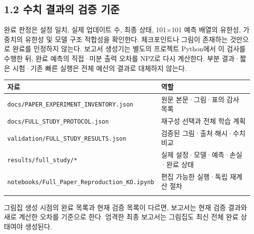\documentclass[10pt,a4paper]{article}
\begin{document}
\subsection{1.2 수치 결과의 검증 기준}

완료 판정은 설정 일치, 실제 업데이트 수, 최종 상태, 101$\times$101 예측 배열의 유한성, 가중치의 유한성 및 모델 구조 적합성을 확인한다. 체크포인트나 그림이 존재하는 것만으로 완료를 인정하지 않는다. 보고서 생성기는 별도의 프로젝트 Python에서 이 검사를 수행한 뒤, 완료 예측의 직접·미분 출력 오차를 NPZ로 다시 계산한다. 부분 결과·짧은 시험·기존 빠른 실행은 전체 예산의 결과로 대체하지 않는다.\par

\begingroup\small

\par\begin{minipage}{\linewidth}\begin{tabular}{>{\raggedright\arraybackslash}p{}>{\raggedright\arraybackslash}p{}}

\rowcolor{tint} \textbf{자료} & \textbf{역할}\\\midrule

\nolinkurl{docs/PAPER_EXPERIMENT_INVENTORY.json} & 원문 본문·그림·표의 감사 목록\\\addlinespace[2pt]

\nolinkurl{docs/FULL_STUDY_PROTOCOL.json} & 재구성 선택과 전체 학습 계획\\\addlinespace[2pt]

\nolinkurl{validation/FULL_STUDY_RESULTS.json} & 검증된 그림·출처 해시·수치 비교\\\addlinespace[2pt]

\nolinkurl{results/full_study/*} & 실제 설정·모델·예측·손실·완료 상태\\\addlinespace[2pt]

\nolinkurl{notebooks/Full_Paper_Reproduction_KO.ipynb} & 편집 가능한 실행·독립 재계산 절차\\\addlinespace[2pt]

\bottomrule\end{tabular}\end{minipage}\par\vspace{5pt}\endgroup

{\small\color{muted} 그림집 생성 시점의 완료 목록과 현재 검증 목록이 다르면, 보고서는 현재 검증 결과와 새로 계산한 오차를 기준으로 한다. 엄격한 최종 보고서는 그림집도 최신 전체 완료 상태여야 생성된다.\par}
\end{document}
